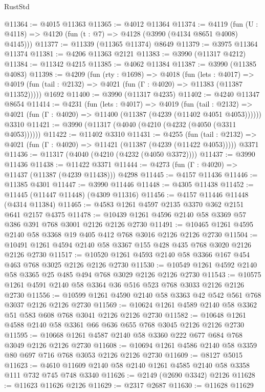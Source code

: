 \begin{lexlean}{RustStd}
\begin{coremodule}
@11364 := @4015 @11363
@11365 := @4012 @11364
@11374 := @4119 (fun (U : @4118) => @4120 (fun (t : @7) => @4128 (@3990 (@4134 @8651 @4008) @4145)))
@11377 := @11339 (@11365 @11374) @8649
@11379 := @3975 @11364 @11374
@11381 := @4206 @11363 @2121
@11383 := @3990 (@11317 @4212)
@11384 := @11342 @4215
@11385 := @4062 @11384
@11387 := @3990 (@11385 @4083)
@11398 := @4209
    (fun (rty : @1698) =>
    @4018
      (fun (lets : @4017) =>
      @4019 (fun (tail : @2132) => @4021 (fun (Γ : @4020) => @11383 (@11387 @11352)))))
    @1692
@11400 := @3990 (@11317 @4235)
@11402 := @4240 @11347 @8654
@11414 := @4231
    (fun (lets : @4017) =>
    @4019
      (fun (tail : @2132) =>
      @4021 (fun (Γ : @4020) => @11400 (@11387 (@4239 (@11402 @4051 @4053))))))
    @3310
@11421 := @3990 (@11317 (@4040 (@4210 (@4232 (@4050 (@3311 @4053))))))
@11422 := @11402 @3310
@11431 := @4255
    (fun (tail : @2132) => @4021 (fun (Γ : @4020) => @11421 (@11387 (@4239 (@11422 @4053)))))
    @3371
@11436 := @11317 (@4040 (@4210 (@4232 (@4050 @3372))))
@11437 := @3990 @11436
@11438 := @11422 @3371
@11444 := @4273 (fun (Γ : @4020) => @11437 (@11387 (@4239 @11438))) @4298
@11445 := @4157 @11436
@11446 := @11385 @4301
@11447 := @3990 @11446
@11448 := @4305 @11438
@11452 := @11445 (@11447 @11448) (@4309 @11316)
@11456 := @4157 @11446 @11448 (@4314 @11384)
@11465 := @4583 @1261 @4597 @2135 @3370 @362 @2151 @641 @2157 @4375
@11478 := @10439 @1261 @4596 @2140 @58 @3369 @57 @386 @391 @768 @3001 @2126 @2126 @2730
@11491 := @10465 @1261 @4595 @2140 @58 @3368 @19 @405 @412 @768 @3016 @2126 @2126 @2730
@11504 := @10491 @1261 @4594 @2140 @58 @3367 @155 @428 @435 @768 @3020 @2126 @2126 @2730
@11517 := @10520 @1261 @4593 @2140 @58 @3366 @167 @454 @463 @768 @3025 @2126 @2126 @2730
@11530 := @10549 @1261 @4592 @2140 @58 @3365 @25 @485 @494 @768 @3029 @2126 @2126 @2730
@11543 := @10575 @1261 @4591 @2140 @58 @3364 @36 @516 @523 @768 @3033 @2126 @2126 @2730
@11556 := @10599 @1261 @4590 @2140 @58 @3363 @42 @542 @561 @768 @3037 @2126 @2126 @2730
@11569 := @10624 @1261 @4589 @2140 @58 @3362 @51 @583 @608 @768 @3041 @2126 @2126 @2730
@11582 := @10648 @1261 @4588 @2140 @58 @3361 @66 @636 @655 @768 @3045 @2126 @2126 @2730
@11595 := @10668 @1261 @4587 @2140 @58 @3360 @222 @677 @684 @768 @3049 @2126 @2126 @2730
@11608 := @10694 @1261 @4586 @2140 @58 @3359 @80 @697 @716 @768 @3053 @2126 @2126 @2730
@11609 := @8127 @5015
@11623 := @4610 @11609 @2140 @58 @2140 @1261 @4585 @2140 @58 @3358 @111 @732 @745 @748 @3340
@11626 := @2149 (@2690 @3342) @2126
@11628 := @11623 @11626 @2126
@11629 := @2317 @2687
@11630 := @11628 @11629

\end{coremodule}
\end{lexlean}
